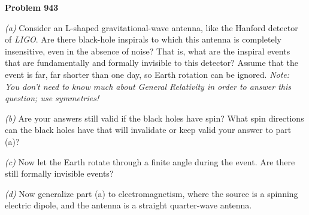 \documentclass[12pt]{article}
\begin{document}
\begin{pottproblem}
\textbf{Problem 943}

\textsl{(a)}
Consider an \textsf{L}-shaped gravitational-wave antenna, like the Hanford detector
of \textsl{LIGO}.
Are there black-hole inspirals to which this antenna is completely insensitive,
even in the absence of noise?
That is, what are the inspiral events that are fundamentally and formally invisible to this
detector?
Assume that the event is far, far shorter than one day, so Earth rotation can be ignored.
\emph{Note: You don't need to know much about General Relativity in order to answer this question; use symmetries!}

\textsl{(b)}
Are your answers still valid if the black holes have spin?
What spin directions can the black holes have that will invalidate
or keep valid your answer to part (a)?

\textsl{(c)}
Now let the Earth rotate through a finite angle during the event.
Are there still formally invisible events?

\textsl{(d)}
Now generalize part (a) to electromagnetism, where the source is a 
spinning electric dipole, and the antenna is a straight quarter-wave antenna.

\end{pottproblem}
\end{document}
